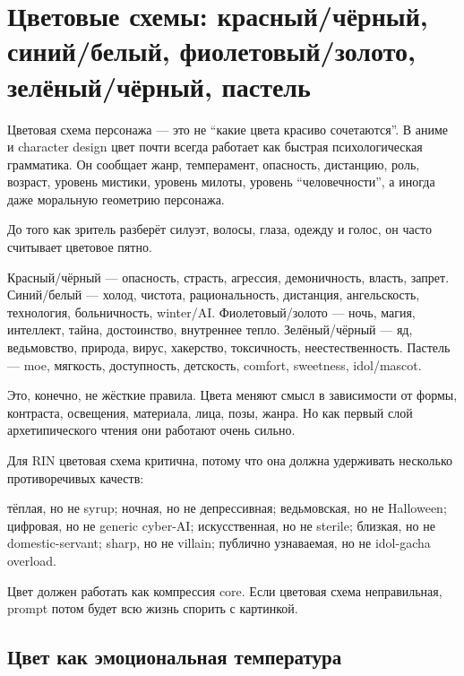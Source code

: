 \section{Цветовые схемы: красный/чёрный, синий/белый, фиолетовый/золото, зелёный/чёрный, пастель}

Цветовая схема персонажа --- это не ``какие цвета красиво сочетаются''.
В аниме и character design цвет почти всегда работает как быстрая
психологическая грамматика. Он сообщает жанр, темперамент, опасность,
дистанцию, роль, возраст, уровень мистики, уровень милоты, уровень
``человечности'', а иногда даже моральную геометрию персонажа.

До того как зритель разберёт силуэт, волосы, глаза, одежду и голос, он
часто считывает цветовое пятно.

Красный/\hspace{0pt}чёрный --- опасность, страсть, агрессия, демоничность, власть,
запрет. Синий/\hspace{0pt}белый --- холод, чистота, рациональность, дистанция,
ангельскость, технология, больничность, winter/\hspace{0pt}AI. Фиолетовый/\hspace{0pt}золото ---
ночь, магия, интеллект, тайна, достоинство, внутреннее тепло.
Зелёный/\hspace{0pt}чёрный --- яд, ведьмовство, природа, вирус, хакерство,
токсичность, неестественность. Пастель --- moe, мягкость, доступность,
детскость, comfort, sweetness, idol/\hspace{0pt}mascot.

Это, конечно, не жёсткие правила. Цвета меняют смысл в зависимости от
формы, контраста, освещения, материала, лица, позы, жанра. Но как первый
слой архетипического чтения они работают очень сильно.

Для RIN цветовая схема критична, потому что она должна удерживать
несколько противоречивых качеств:

тёплая, но не syrup; ночная, но не депрессивная; ведьмовская, но не
Halloween; цифровая, но не generic cyber-AI; искусственная, но не
sterile; близкая, но не domestic-servant; sharp, но не villain; публично
узнаваемая, но не idol-gacha overload.

Цвет должен работать как компрессия core. Если цветовая схема
неправильная, prompt потом будет всю жизнь спорить с картинкой.

\subsection*{Цвет как эмоциональная температура}

